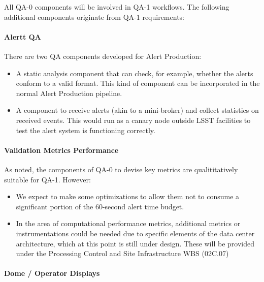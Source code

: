 All QA-0 components will be involved in QA-1 workflows. The following additional components originate from QA-1 requirements:

\paragraph{Alertt QA}
\label{sec:qaAlertQA}

There are two QA components developed for Alert Production:

\begin{itemize}

\item A static analysis component that can check, for example, whether the alerts conform to a valid format. This kind of component can be incorporated in the normal Alert Production pipeline. 

\item A component to receive alerts (akin to a mini-broker) and collect statistics on received events. This would run as a canary node outside LSST facilities to test the alert system is functioning correctly. 

\end{itemize}

\paragraph{Validation Metrics Performance}
\label{sec:qaPerfValidate}

As noted, the components of QA-0 to devise key metrics are
qualititatively suitable for QA-1. However:

\begin{itemize}

\item We expect to make some optimizations to allow them not to consume a significant portion of the 60-second alert time budget. 

\item In the area of computational performance metrics, additional metrics or instrumentations could be needed due to specific elements of the data center architecture, which at this point is still under design. These will be provided under the Processing Control and Site Infrastructure WBS (02C.07)

\end{itemize}

\paragraph{Dome / Operator Displays}
\label{sec:qaDomeDisplay}

